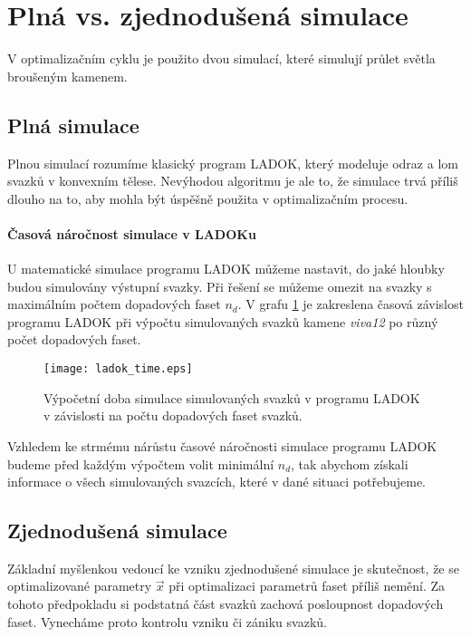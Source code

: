 \newpage

\section{Plná vs. zjednodušená simulace}
V optimalizačním cyklu je použito dvou simulací, které simulují průlet světla broušeným kamenem.

\subsection{Plná simulace}
Plnou simulací rozumíme klasický program LADOK, který modeluje odraz a lom svazků v konvexním tělese. Nevýhodou algoritmu je ale to, že simulace trvá příliš dlouho na to, aby mohla být úspěšně použita v optimalizačním procesu.

\paragraph{Časová náročnost simulace v LADOKu}
\hspace{1mm}

	U matematické simulace programu LADOK můžeme nastavit, do jaké hloubky budou simulovány výstupní svazky. Při řešení se můžeme omezit na svazky s maximálním počtem dopadových faset $n_d$. V grafu \ref{fig: ladok_time} je zakreslena časová závislost programu LADOK při výpočtu simulovaných svazků kamene \textit{viva12} po různý počet dopadových faset. 
	
	\begin{figure}[htbp]
    \centering\texttt{[image: ladok\_time.eps]}
     \caption[Časová náročnost simulace LADOK.]{Výpočetní doba simulace simulovaných svazků v programu LADOK v závislosti na počtu dopadových faset svazků.}
 \label{fig: ladok_time}
 \end{figure}

	
	Vzhledem ke strmému nárůstu časové náročnosti simulace programu LADOK budeme před každým výpočtem volit minimální $n_d$, tak abychom získali informace o všech simulovaných svazcích, které v dané situaci potřebujeme.      


\subsection{Zjednodušená simulace}
Základní myšlenkou vedoucí ke vzniku zjednodušené simulace je skutečnost, že se optimalizované parametry $\vec{x}$ při optimalizaci parametrů faset příliš nemění. Za tohoto předpokladu si podstatná část svazků zachová posloupnost dopadových faset. Vynecháme proto kontrolu vzniku či zániku svazků. 

